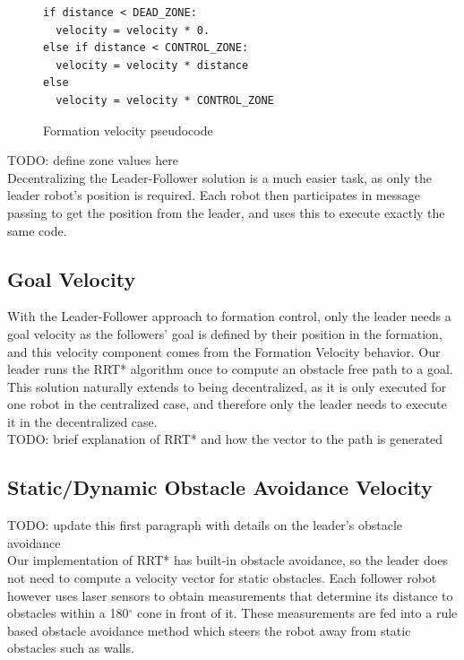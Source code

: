 \documentclass[letterpaper, 10 pt, conference]{ieeeconf}  %
\begin{document}
\begin{figure}[thpb]
\centering
\lstset{language=python}
\begin{lstlisting}
if distance < DEAD_ZONE:
  velocity = velocity * 0.
else if distance < CONTROL_ZONE:
  velocity = velocity * distance
else
  velocity = velocity * CONTROL_ZONE
\end{lstlisting}
\caption{Formation velocity pseudocode}
\label{zonecode}
\end{figure}

TODO: define zone values here \\

Decentralizing the Leader-Follower solution is a much easier task, as only the leader robot's position is required. Each robot then participates in message passing to get the position from the leader, and uses this to execute exactly the same code.

\subsection{Goal Velocity}

With the Leader-Follower approach to formation control, only the leader needs a goal velocity as the followers' goal is defined by their position in the formation, and this velocity component comes from the Formation Velocity behavior. Our leader runs the RRT* algorithm once to compute an obstacle free path to a goal. \\

This solution naturally extends to being decentralized, as it is only executed for one robot in the centralized case, and therefore only the leader needs to execute it in the decentralized case. \\

TODO: brief explanation of RRT* and how the vector to the path is generated

\subsection{Static/Dynamic Obstacle Avoidance Velocity}

TODO: update this first paragraph with details on the leader's obstacle avoidance \\

Our implementation of RRT* has built-in obstacle avoidance, so the leader does not need to compute a velocity vector for static obstacles. Each follower robot however uses laser sensors to obtain measurements that determine its distance to obstacles within a 180$^{\circ}$ cone in front of it. These measurements are fed into a rule based obstacle avoidance method which steers the robot away from static obstacles such as walls. \\
\end{document}
